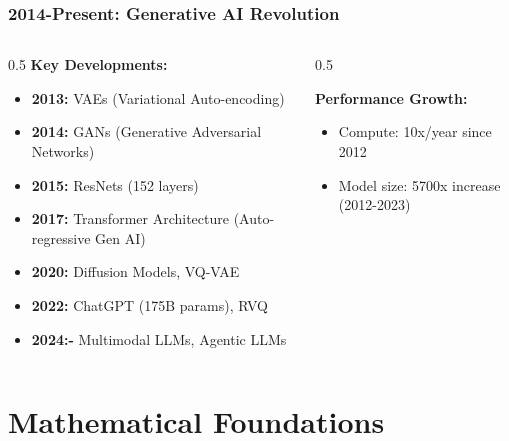 \documentclass[5pt,aspectratio=169]{beamer}
\begin{document}
\begin{frame}
\frametitle{2014-Present: Generative AI Revolution}

\begin{columns}[T]
\begin{column}{0.5\textwidth}
\textbf{Key Developments:}
\begin{itemize}
\item \textbf{2013:} VAEs (Variational Auto-encoding)
\item \textbf{2014:} GANs (Generative Adversarial Networks)
\item \textbf{2015:} ResNets (152 layers)
\item \textbf{2017:} Transformer Architecture (Auto-regressive Gen AI)
\item \textbf{2020:} Diffusion Models, VQ-VAE
\item \textbf{2022:} ChatGPT (175B params), RVQ
\item \textbf{2024:-} Multimodal LLMs, Agentic LLMs
\end{itemize}
\end{column}


\begin{column}{0.5\textwidth}
\textbf{Performance Growth:}
\begin{itemize}
\item Compute: 10x/year since 2012
\item Model size: 5700x increase (2012-2023)
\end{itemize}
\end{column}
\end{columns}


\end{frame}






\section{Mathematical Foundations}
\end{document}
